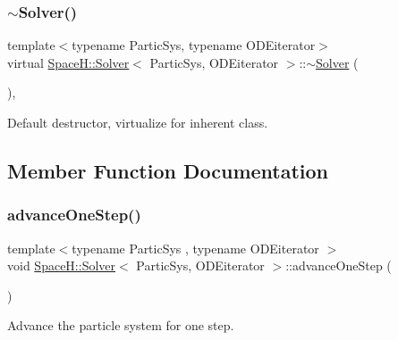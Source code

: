 \subsubsection{\texorpdfstring{$\sim$\+Solver()}{~Solver()}}
{\footnotesize\ttfamily template$<$typename Partic\+Sys, typename O\+D\+Eiterator$>$ \\
virtual \mbox{\hyperlink{class_space_h_1_1_solver}{Space\+H\+::\+Solver}}$<$ Partic\+Sys, O\+D\+Eiterator $>$\+::$\sim$\mbox{\hyperlink{class_space_h_1_1_solver}{Solver}} (\begin{DoxyParamCaption}{ }\end{DoxyParamCaption})\hspace{0.3cm}{\ttfamily [inline]}, {\ttfamily [virtual]}}



Default destructor, virtualize for inherent class. 



\subsection{Member Function Documentation}
\mbox{\label{class_space_h_1_1_solver_a28a4fd8cbf6df0d2bd1e3d376275f57e}} 
\subsubsection{\texorpdfstring{advance\+One\+Step()}{advanceOneStep()}}
{\footnotesize\ttfamily template$<$typename Partic\+Sys , typename O\+D\+Eiterator $>$ \\
void \mbox{\hyperlink{class_space_h_1_1_solver}{Space\+H\+::\+Solver}}$<$ Partic\+Sys, O\+D\+Eiterator $>$\+::advance\+One\+Step (\begin{DoxyParamCaption}{ }\end{DoxyParamCaption})\hspace{0.3cm}{\ttfamily [inline]}}



Advance the particle system for one step. 

